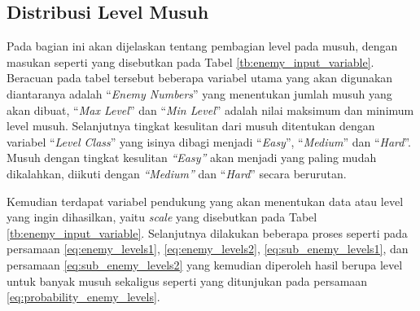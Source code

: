 \subsection{Distribusi Level Musuh}
\label{sec:sub_sec3_enemy_level}
\vspace{1ex}

Pada bagian ini akan dijelaskan tentang pembagian level pada musuh, dengan masukan seperti yang disebutkan pada Tabel \ref{tb:enemy_input_variable}. Beracuan pada tabel tersebut beberapa variabel utama yang akan digunakan diantaranya adalah ``\textit{Enemy Numbers}'' yang menentukan jumlah musuh yang akan dibuat, ``\textit{Max Level}'' dan ``\textit{Min Level}'' adalah nilai maksimum dan minimum level musuh. Selanjutnya tingkat kesulitan dari musuh ditentukan dengan variabel ``\textit{Level Class}'' yang isinya dibagi menjadi ``\textit{Easy}'', ``\textit{Medium}'' dan ``\textit{Hard}''. Musuh dengan tingkat kesulitan \textit{``Easy''} akan menjadi yang paling mudah dikalahkan, diikuti dengan \textit{``Medium''} dan ``\textit{Hard}'' secara berurutan.
\vspace{1ex}

Kemudian terdapat variabel pendukung yang akan menentukan data atau level yang ingin dihasilkan, yaitu \textit{scale} yang disebutkan pada Tabel \ref{tb:enemy_input_variable}. Selanjutnya dilakukan beberapa proses seperti pada persamaan \ref{eq:enemy_levels1}, \ref{eq:enemy_levels2}, \ref{eq:sub_enemy_levels1}, dan persamaan \ref{eq:sub_enemy_levels2} yang kemudian diperoleh hasil berupa level untuk banyak musuh sekaligus seperti yang ditunjukan pada persamaan \ref{eq:probability_enemy_levels}.
\vspace{1ex}

